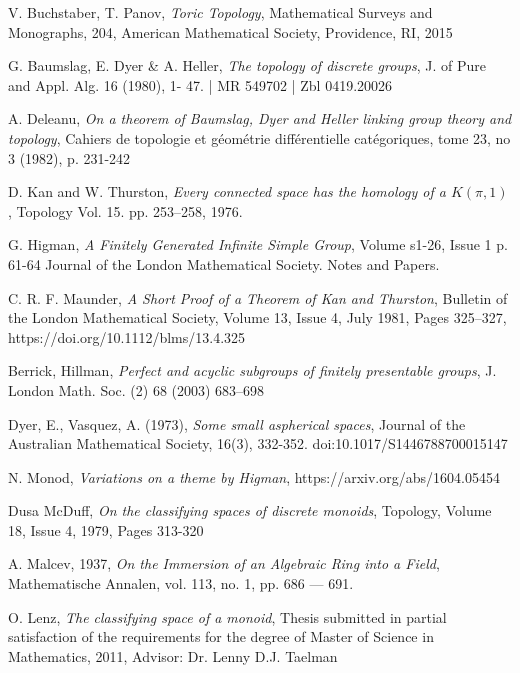 \documentclass[14pt, dvipsnames]{extarticle}
\theoremstyle{definition}
\theoremstyle{remark}
\begin{document}
\begin{thebibliography}{}



V. Buchstaber, T. Panov, {\it Toric Topology}, Mathematical Surveys and Monographs, 204, American Mathematical Society, Providence, RI, 2015


G. Baumslag, E. Dyer \& A. Heller, {\it The topology of discrete groups}, J. of Pure and Appl. Alg. 16 (1980), 1- 47. | MR 549702 | Zbl 0419.20026


A. Deleanu, {\it On a theorem of Baumslag, Dyer and Heller linking group theory and topology}, Cahiers de topologie et géométrie différentielle catégoriques, tome 23, no 3 (1982), p. 231-242 


D. Kan and W. Thurston, {\it Every connected space has the homology of a $K(\pi, 1)$}, Topology Vol. 15. pp. 253–258, 1976. 


G. Higman, {\it A Finitely Generated Infinite Simple Group}, Volume s1-26, Issue 1 p. 61-64 Journal of the London Mathematical Society. Notes and Papers.



C. R. F. Maunder, {\it A Short Proof of a Theorem of Kan and Thurston}, Bulletin of the London Mathematical Society, Volume 13, Issue 4, July 1981, Pages 325–327, https://doi.org/10.1112/blms/13.4.325


Berrick, Hillman, {\it Perfect and acyclic subgroups of finitely
presentable groups}, J. London Math. Soc. (2) 68 (2003) 683–698


Dyer, E., Vasquez, A. (1973), {\it Some small aspherical spaces}, Journal of the Australian Mathematical Society, 16(3), 332-352. doi:10.1017/S1446788700015147


N. Monod, {\it Variations on a theme by Higman}, https://arxiv.org/abs/1604.05454


Dusa McDuff, {\it On the classifying spaces of discrete monoids}, Topology, Volume 18, Issue 4, 1979, Pages 313-320


A. Malcev, 1937, {\it On the Immersion of an Algebraic Ring into a Field}, Mathematische Annalen, vol. 113, no. 1, pp. 686 — 691.



O. Lenz, {\it The classifying space of a monoid}, Thesis submitted in partial satisfaction of the requirements for the degree of Master of Science in Mathematics, 2011, Advisor: Dr. Lenny D.J. Taelman




\end{thebibliography}
\end{document}
